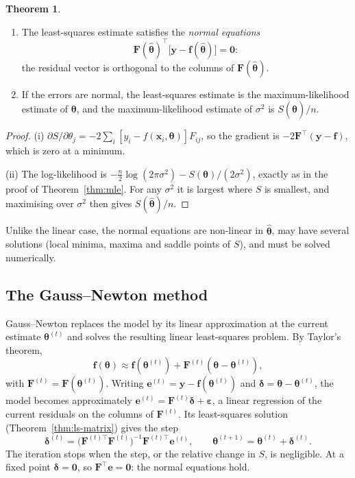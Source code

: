 \documentclass[11pt,a4paper]{article}
\numberwithin{equation}{section}
\theoremstyle{definition}
\newtheorem{thm}{Theorem}[subsection]
\begin{document}
\begin{thm}\label{thm:nl-normal}
\begin{enumerate}[label=(\roman*)]
\item The least-squares estimate satisfies the \emph{normal equations}
\[
\mathbf{F}(\hat{\boldsymbol\theta})^\top\bigl[\mathbf{y} - \mathbf{f}(\hat{\boldsymbol\theta})\bigr] = \mathbf{0} :
\]
the residual vector is orthogonal to the columns of $\mathbf{F}(\hat{\boldsymbol\theta})$.
\item If the errors are normal, the least-squares estimate is the maximum-likelihood estimate of $\boldsymbol\theta$, and
the maximum-likelihood estimate of $\sigma^2$ is $S(\hat{\boldsymbol\theta})/n$.
\end{enumerate}
\end{thm}

\begin{proof}
(i) $\partial S/\partial\theta_j = -2\sum_i[y_i - f(\mathbf{x}_i, \boldsymbol\theta)]F_{ij}$, so the gradient is $-2\mathbf{F}^\top(\mathbf{y} - \mathbf{f})$, which is zero at a minimum.

(ii) The log-likelihood is $-\frac n2\log(2\pi\sigma^2) - S(\boldsymbol\theta)/(2\sigma^2)$, exactly as in the proof of Theorem~\ref{thm:mle}. For any
$\sigma^2$ it is largest where $S$ is smallest, and maximising over $\sigma^2$ then gives $S(\hat{\boldsymbol\theta})/n$.
\end{proof}

Unlike the linear case, the normal equations are non-linear in $\hat{\boldsymbol\theta}$, may have several solutions (local
minima, maxima and saddle points of $S$), and must be solved numerically.

\subsection{The Gauss--Newton method}
Gauss--Newton replaces the model by its linear approximation at the current estimate $\boldsymbol\theta^{(t)}$ and solves the
resulting linear least-squares problem. By Taylor's theorem,
\[
\mathbf{f}(\boldsymbol\theta) \approx \mathbf{f}(\boldsymbol\theta^{(t)}) + \mathbf{F}^{(t)}(\boldsymbol\theta - \boldsymbol\theta^{(t)}) ,
\]
with $\mathbf{F}^{(t)} = \mathbf{F}(\boldsymbol\theta^{(t)})$. Writing $\mathbf{e}^{(t)} = \mathbf{y} - \mathbf{f}(\boldsymbol\theta^{(t)})$ and $\boldsymbol\delta = \boldsymbol\theta - \boldsymbol\theta^{(t)}$, the model becomes approximately
$\mathbf{e}^{(t)} = \mathbf{F}^{(t)}\boldsymbol\delta + \boldsymbol\varepsilon$, a linear regression of the current residuals on the columns of $\mathbf{F}^{(t)}$. Its
least-squares solution (Theorem~\ref{thm:ls-matrix}) gives the step
\[
\boldsymbol\delta^{(t)} = \bigl(\mathbf{F}^{(t)\top}\mathbf{F}^{(t)}\bigr)^{-1}\mathbf{F}^{(t)\top}\mathbf{e}^{(t)} , \qquad \boldsymbol\theta^{(t+1)} = \boldsymbol\theta^{(t)} + \boldsymbol\delta^{(t)} .
\]
The iteration stops when the step, or the relative change in $S$, is negligible. At a fixed point $\boldsymbol\delta = \mathbf{0}$, so
$\mathbf{F}^\top\mathbf{e} = \mathbf{0}$: the normal equations hold.
\end{document}
